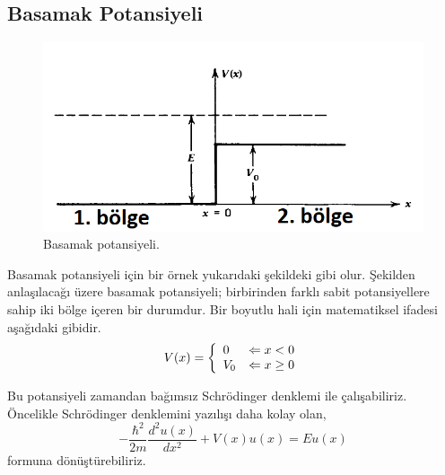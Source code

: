 \documentclass[a4paper,12pt, twoside]{article}
\begin{document}
\subsection{Basamak Potansiyeli}
\begin{figure}[hbtp]
	\centering
	\includegraphics[width=0.7\linewidth]{figurler/Basamak_Potansiyeli}
	\caption{Basamak potansiyeli.}
	\label{fig:basamakpotansiyeli}
\end{figure}
Basamak potansiyeli için bir örnek yukarıdaki şekildeki gibi olur. Şekilden anlaşılacağı üzere basamak potansiyeli; birbirinden farklı sabit potansiyellere sahip iki bölge içeren bir durumdur. Bir boyutlu hali için matematiksel ifadesi aşağıdaki gibidir.
\begin{equation}
V ( x )  = \left\{ 
\begin{array} { l l } 
{ 0 } & {\Leftarrow x < 0 } \\ 
{ V _ { 0 } } & {\Leftarrow x \geq 0 } 
\end{array} \right. 
\end{equation}

Bu potansiyeli zamandan bağımsız Schrödinger denklemi ile çalışabiliriz. Öncelikle Schrödinger denklemini yazılışı daha kolay olan,
\begin{equation}
- \frac { \hbar ^ { 2 } } { 2 m } \frac { d ^ { 2 } u ( x ) } { d x ^ { 2 } } + V ( x ) u ( x ) = E u ( x )
\end{equation}
formuna dönüştürebiliriz.
\end{document}
